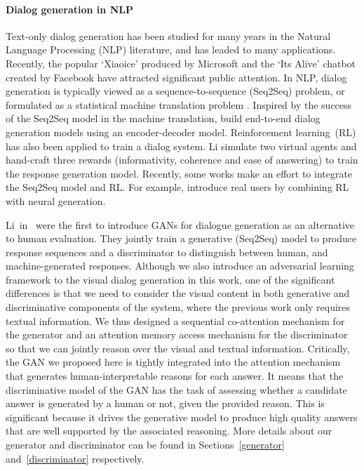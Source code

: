 \documentclass[10pt,twocolumn,letterpaper]{article}
\begin{document}
\paragraph{Dialog generation in NLP}
Text-only dialog generation \cite{li2016deep,li2017adversarial,ritter2011data,sordoni2015neural,xu2016incorporating} has been studied for many years in the Natural Language Processing (NLP) literature, and has leaded to many applications. Recently, the popular `Xiaoice' produced by Microsoft and the `Its Alive' chatbot created by Facebook have attracted significant public attention. In NLP, dialog generation is typically viewed as a sequence-to-sequence (Seq2Seq) problem, or formulated as a statistical machine translation problem \cite{ritter2011data,sordoni2015neural}. Inspired by the success of the Seq2Seq model \cite{sutskever2014sequence} in the machine translation, \cite{serban2016building,vinyals2015neural} build end-to-end dialog generation models using an encoder-decoder model. Reinforcement learning~(RL) has also been applied to train a dialog system. Li \etal \cite{li2016deep} simulate two virtual agents and hand-craft three rewards (informativity, coherence and ease of answering) to train the response generation model. Recently, some works make an effort to integrate the Seq2Seq model and RL. For example, \cite{asghar2016online,su2016continuously} introduce real users by combining RL with neural generation. 

Li~\etal in~\cite{li2017adversarial} were the first to introduce GANs for dialogue generation as an alternative to human evaluation.
They jointly train a generative (Seq2Seq) model to produce response sequences and a discriminator to distinguish between human, and machine-generated responses. Although we also introduce an adversarial learning framework to the visual dialog generation in this work, one of the significant differences is that we need to consider the visual content in both generative and discriminative components of the system, where the previous work \cite{li2017adversarial} only requires textual information. We thus designed a sequential co-attention mechanism for the generator and an attention memory access mechanism for the discriminator so that we can jointly reason over the visual and textual information. Critically, the GAN we proposed here is tightly integrated into the attention mechanism that generates human-interpretable reasons for each answer. It means that the discriminative model of the GAN has the task of assessing whether a candidate answer is generated by a human or not, given the provided reason. This is significant because it drives the generative model to produce high quality answers that are well supported by the associated reasoning. More details about our generator and discriminator can be found in Sections~\ref{generator} and~\ref{discriminator} respectively.
\end{document}
